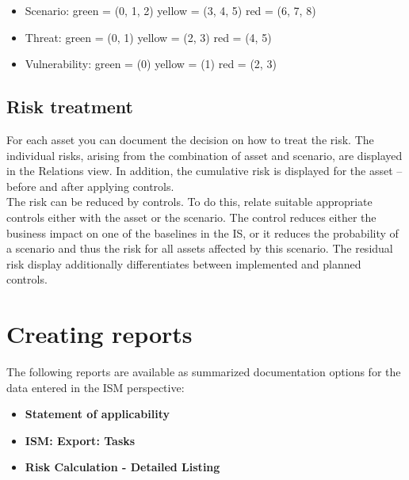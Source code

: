 \documentclass[a4paper,10pt]{book}
\begin{document}
\begin{itemize}
 \item Scenario:
 \subitem green = (0, 1, 2)
 \subitem yellow = (3, 4, 5)
 \subitem red = (6, 7, 8)
\end{itemize}

\begin{itemize}
 \item Threat:
 \subitem green = (0, 1)
 \subitem yellow = (2, 3)
 \subitem red = (4, 5)
\end{itemize}

\begin{itemize}
 \item Vulnerability:
 \subitem green = (0)
 \subitem yellow = (1)
 \subitem red = (2, 3)
\end{itemize}


\subsection{Risk treatment}
For each asset you can document the decision on how to treat the risk. The individual risks, arising from the combination
of asset and scenario, are displayed in the Relations view. In addition, the cumulative risk is displayed for the asset –
before and after applying controls.
\newline\\
The risk can be reduced by controls. To do this, relate suitable appropriate controls either with the asset or the scenario.
The control reduces either the business impact on one of the baselines in the IS, or it reduces the probability of a scenario
and thus the risk for all assets affected by this scenario. The residual risk display additionally differentiates between
implemented and planned controls.

\section{Creating reports}
\label{sec:ism-creating-reports}

The following reports are available as summarized documentation options for the
data entered in the ISM perspective:

\begin{itemize}
\item \textbf{Statement of applicability}
\item \textbf{ISM: Export: Tasks}
\item \textbf{Risk Calculation - Detailed Listing}
\end{itemize}
\end{document}
